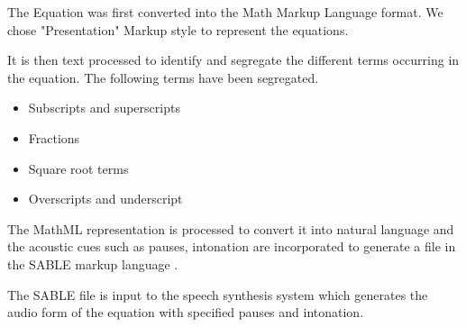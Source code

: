 \documentclass{acm_proc_article-sp}
\begin{document}
\begin{figure}[t]
{

}

\end{figure}

The Equation was first converted into the Math Markup Language format. We chose "Presentation" Markup style to represent the equations.  

It is then text processed to identify and segregate the different terms occurring in the equation. The following terms have been segregated.



\begin{itemize}

\item Subscripts and superscripts 

\item Fractions

\item Square root terms

\item Overscripts and underscript

\end{itemize}



The MathML representation is processed to convert it into natural language and the acoustic cues such as pauses, intonation are incorporated to generate a file in the SABLE markup language \cite{sproat1998sable}. 


The SABLE file is input to the speech synthesis system which generates the audio form of the equation with specified pauses and intonation.
\end{document}

